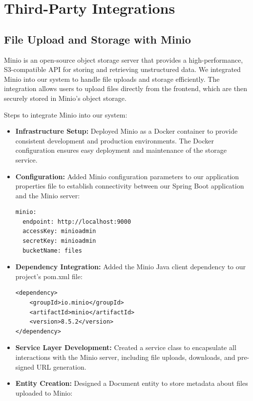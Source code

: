 \section{Third-Party Integrations}
\subsection{File Upload and Storage with Minio}
Minio \cite{minio} is an open-source object storage server that provides a high-performance, S3-compatible API for storing and retrieving unstructured data. We integrated Minio into our system to handle file uploads and storage efficiently. The integration allows users to upload files directly from the frontend, which are then securely stored in Minio's object storage.

Steps to integrate Minio into our system:
\begin{itemize}
    \item \textbf{Infrastructure Setup:} Deployed Minio as a Docker container to provide consistent development and production environments. The Docker configuration ensures easy deployment and maintenance of the storage service.
    
    \item \textbf{Configuration:} Added Minio configuration parameters to our application properties file to establish connectivity between our Spring Boot application and the Minio server:
    
    \begin{verbatim}
minio:
  endpoint: http://localhost:9000
  accessKey: minioadmin
  secretKey: minioadmin
  bucketName: files
    \end{verbatim}
    
    \item \textbf{Dependency Integration:} Added the Minio Java client dependency to our project's pom.xml file:
    
    \begin{verbatim}
<dependency>
    <groupId>io.minio</groupId>
    <artifactId>minio</artifactId>
    <version>8.5.2</version>
</dependency>
    \end{verbatim}
    
    \item \textbf{Service Layer Development:} Created a service class to encapsulate all interactions with the Minio server, including file uploads, downloads, and pre-signed URL generation.
    
    \item \textbf{Entity Creation:} Designed a Document entity to store metadata about files uploaded to Minio:
    

\end{itemize}
